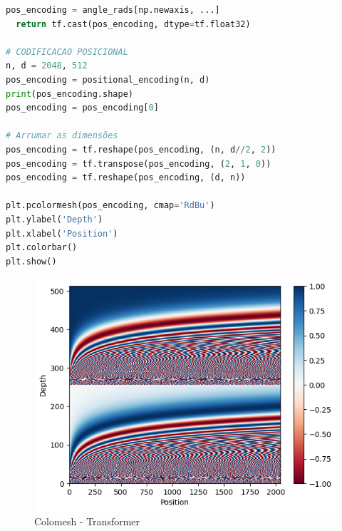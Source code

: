 \begin{lstlisting}[language=Python, style=input]
  pos_encoding = angle_rads[np.newaxis, ...]
  return tf.cast(pos_encoding, dtype=tf.float32)

# CODIFICACAO POSICIONAL
n, d = 2048, 512
pos_encoding = positional_encoding(n, d)
print(pos_encoding.shape)
pos_encoding = pos_encoding[0]

# Arrumar as dimensões
pos_encoding = tf.reshape(pos_encoding, (n, d//2, 2))
pos_encoding = tf.transpose(pos_encoding, (2, 1, 0))
pos_encoding = tf.reshape(pos_encoding, (d, n))

plt.pcolormesh(pos_encoding, cmap='RdBu')
plt.ylabel('Depth')
plt.xlabel('Position')
plt.colorbar()
plt.show()
\end{lstlisting}


\begin{figure}[H]
\centering
\includegraphics[width=.7\linewidth]{apendices/fig/9_IAA009_9.png}
\caption{Colomesh - Transformer}
\end{figure}


